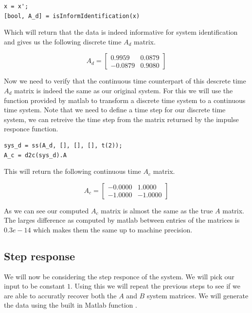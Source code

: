 \begin{lstlisting}
x = x';
[bool, A_d] = isInformIdentification(x)
\end{lstlisting}

Which will return that the data is indeed informative for system identification and gives us the following discrete time $A_d$ matrix.

\begin{equation*}
	A_d = \begin{bmatrix}
		 0.9959 &   0.0879 \\
		-0.0879 &   0.9080
	\end{bmatrix}
\end{equation*}

Now we need to verify that the continuous time counterpart of this descrete time $A_d$ matrix is indeed the same as our original system. For this we will use the function  provided by matlab to transform a discrete time system to a continuous time system. Note that we need to define a time step for our discrete time system, we can retreive the time step from the  matrix returned by the impulse responce function.

\begin{lstlisting}
sys_d = ss(A_d, [], [], [], t(2));
A_c = d2c(sys_d).A
\end{lstlisting}

This will return the following continuous time $A_c$ matrix.

\begin{equation*}
	A_c = \begin{bmatrix}
		-0.0000 &   1.0000\\
		-1.0000 &  -1.0000
	\end{bmatrix}
\end{equation*}

As we can see our computed $A_c$ matrix is almost the same as the true $A$ matrix. The larges difference as computed by matlab between entries of the matrices is $0.3e-14$ which makes them the same up to machine precision.

\subsection{Step response}
We will now be considering the step responce of the system. We will pick our input to be constant $1$. Using this we will repeat the previous steps to see if we are able to accuratly recover both the $A$ and $B$ system matrices. We will generate the data using the built in Matlab function . 

